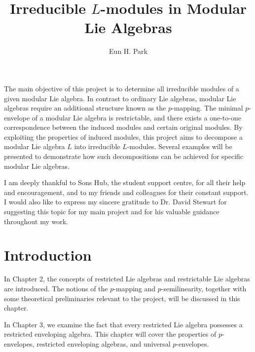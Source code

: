 \documentclass[12pt,MSc]{muthesis_2023}
\theoremstyle{plain}%
\theoremstyle{definition}
\theoremstyle{remark}
\begin{document}
\title{Irreducible $L$-modules in Modular Lie Algebras}

\author{Eun H. Park}


\beforeabstract

The main objective of this project is to determine all irreducible modules of a given modular Lie algebra. In contrast to ordinary Lie algebras, modular Lie algebras require an additional structure known as the $p$-mapping. The minimal $p$-envelope of a modular Lie algebra is restrictable, and there exists a one-to-one correspondence between the induced modules and certain original modules. By exploiting the properties of induced modules, this project aims to decompose a modular Lie algebra $L$ into irreducible $L$-modules. Several examples will be presented to demonstrate how such decompositions can be achieved for specific modular Lie algebras.


\afterabstract

I am deeply thankful to Sons Hub, the student support centre, for all their help and encouragement, and to my friends and colleagues for their constant support. I would also like to express my sincere gratitude to Dr. David Stewart for suggesting this topic for my main project and for his valuable guidance throughout my work.


\afterpreface



\chapter{Introduction}

In Chapter 2, the concepts of restricted Lie algebras and restrictable Lie algebras are introduced. The notions of the $p$-mapping and $p$-semilinearity, together with some theoretical preliminaries relevant to the project, will be discussed in this chapter.

In Chapter 3, we examine the fact that every restricted Lie algebra possesses a restricted enveloping algebra. This chapter will cover the properties of $p$-envelopes, restricted enveloping algebras, and universal $p$-envelopes.
\end{document}
